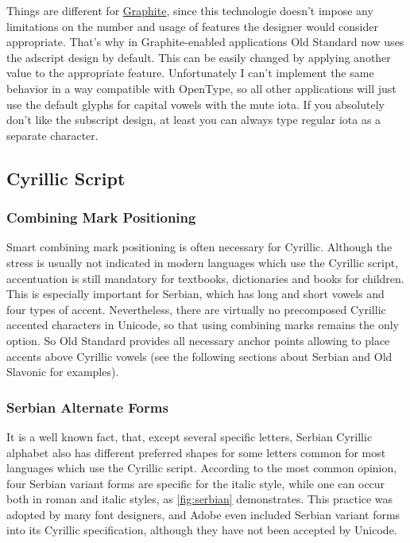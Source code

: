 \documentclass[12pt,a4paper,openany]{book}
\begin{document}
Things are different for \hyperlink{Graphite}{Graphite}, since this
technologie doesn't impose any limitations on the number and usage of
features the designer would consider appropriate. That's why in Graphite-enabled
applications Old Standard now uses the adscript design by default. This
can be easily changed by applying another value to the appropriate
feature. Unfortunately I can't implement the same behavior in a way
compatible with OpenType, so all other applications will just use the
default glyphs for capital vowels with the mute iota. If you absolutely
don’t like the subscript design, at least you can always type regular
iota as a separate character. 

\subsection{Cyrillic Script}

\subsubsection{Combining Mark Positioning}

Smart combining mark positioning is often necessary for Cyrillic.
Although the stress is usually not indicated in modern languages which use
the Cyrillic script, accentuation is still mandatory for textbooks,
dictionaries and books for children. This is especially important for
Serbian, which has long and short vowels and four types of accent.
Nevertheless, there are virtually no precomposed Cyrillic accented
characters in Unicode, so that using combining marks remains the only
option. So Old Standard provides all necessary anchor points allowing to
place accents above Cyrillic vowels (see the following sections about
Serbian and Old Slavonic for examples).

\subsubsection{Serbian Alternate Forms}

It is a well known fact, that, except several specific letters, Serbian
Cyrillic alphabet also has different preferred shapes for some letters
common for most languages which use the Cyrillic script. According to the
most common opinion, four Serbian variant forms are specific for the
italic style, while one can occur both in roman and italic styles, as
\autoref{fig:serbian} demonstrates. This practice was adopted by many font
designers, and Adobe even included Serbian variant forms into its Cyrillic
specification, although they have not been accepted by Unicode.
\end{document}

